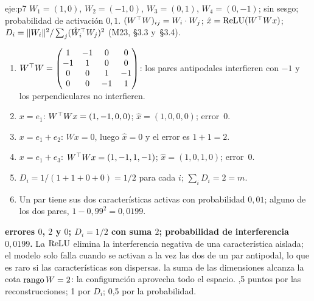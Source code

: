 \begin{solucion}{eje:p7}
\datos $W_1=(1,0)$, $W_2=(-1,0)$, $W_3=(0,1)$, $W_4=(0,-1)$; sin sesgo; probabilidad de activación $0{,}1$.
\planteamiento $(W^{\top} W)_{ij}=W_i\cdot W_j$; $\hat x=\operatorname{ReLU}(W^{\top} Wx)$; $D_i=\lVert W_i\rVert^{2}/\sum_j(\hat W_i^{\top} W_j)^{2}$ (M23, §3.3 y~§3.4).
\pasos
\begin{enumerate}[label=\arabic*.]
  \item $W^{\top} W=\begin{pmatrix}1&-1&0&0\\-1&1&0&0\\0&0&1&-1\\0&0&-1&1\end{pmatrix}$: los pares antipodales interfieren con $-1$ y los perpendiculares no interfieren.
  \item $x=e_1$: $W^{\top} Wx=(1,-1,0,0)$; $\hat x=(1,0,0,0)$; error~0.
  \item $x=e_1+e_2$: $Wx=0$, luego $\hat x=0$ y el error es $1+1=2$.
  \item $x=e_1+e_3$: $W^{\top} Wx=(1,-1,1,-1)$; $\hat x=(1,0,1,0)$; error~0.
  \item $D_i=1/(1+1+0+0)=1/2$ para cada $i$; $\sum_iD_i=2=m$.
  \item Un par tiene sus dos características activas con probabilidad $0{,}01$; alguno de los dos pares, $1-0{,}99^{2}=0{,}0199$.
\end{enumerate}
\resultado \textbf{errores $0$, $2$ y $0$; $D_i=1/2$ con suma $2$; probabilidad de interferencia $0{,}0199$.} La $\operatorname{ReLU}$ elimina la interferencia negativa de una característica aislada; el modelo solo falla cuando se activan a la vez las dos de un par antipodal, lo que es raro si las características son dispersas.
\comprobacion la suma de las dimensiones alcanza la cota $\operatorname{rango} W=2$: la configuración aprovecha todo el espacio.
,5 puntos por las reconstrucciones; 1 por $D_i$; 0,5 por la probabilidad.


\end{solucion}
